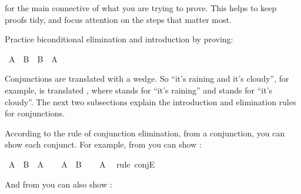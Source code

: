 \begin{isabellebody}
\begin{isamarkuptext}
for the main connective of what you are trying to prove. This helps to keep proofs tidy, and focus
attention on the steps that matter most.%
\end{isamarkuptext}\isamarkuptrue%
%
\begin{isamarkuptext}%
\begin{Exercise}[label = biconditional] 
Practice biconditional elimination and introduction by proving: \end{Exercise}%
\end{isamarkuptext}\isamarkuptrue%
\isamarkupfalse%
\ {\isachardoublequoteopen}{\isacharparenleft}A\ {\isasymlongleftrightarrow}\ B{\isacharparenright}\ {\isasymlongleftrightarrow}\ {\isacharparenleft}B\ {\isasymlongleftrightarrow}\ A{\isacharparenright}{\isachardoublequoteclose}%
\isadelimproof
\ %
\endisadelimproof
%
\isatagproof
{}\isamarkupfalse%
%
\endisatagproof
{\isafoldproof}%
%
\isadelimproof
%
\endisadelimproof
%
\isamarkuptrue%
%
\begin{isamarkuptext}%
Conjunctions are translated with a wedge. So ``it's raining and it's cloudy'', for example,
is translated , where  stands for ``it's raining'' and  stands
for ``it's cloudy''. The next two subsections explain the introduction and elimination rules for
conjunctions.%
\end{isamarkuptext}\isamarkuptrue%
%
\isamarkuptrue%
%
\begin{isamarkuptext}%
According to the rule of conjunction elimination, from a conjunction, you can show each
conjunct. For example, from  you can show :%
\end{isamarkuptext}\isamarkuptrue%
\isamarkupfalse%
\ {\isachardoublequoteopen}A\ {\isasymand}\ B\ {\isasymlongrightarrow}\ A{\isachardoublequoteclose}\isanewline
%
\isadelimproof
%
\endisadelimproof
%
\isatagproof
{}\isamarkupfalse%
\isanewline
\ \ \isamarkupfalse%
\ {\isachardoublequoteopen}A\ {\isasymand}\ B{\isachardoublequoteclose}\isanewline
\ \ \isamarkupfalse%
\ {\isachardoublequoteopen}A{\isachardoublequoteclose}\ \isamarkupfalse%
\ {\isacharparenleft}rule\ conjE{\isacharparenright}\isanewline
{}\isamarkupfalse%
%
\endisatagproof
{\isafoldproof}%
%
\isadelimproof
%
\endisadelimproof
%
\begin{isamarkuptext}%
And from  you can also show :%

\end{isamarkuptext}
\end{isabellebody}
